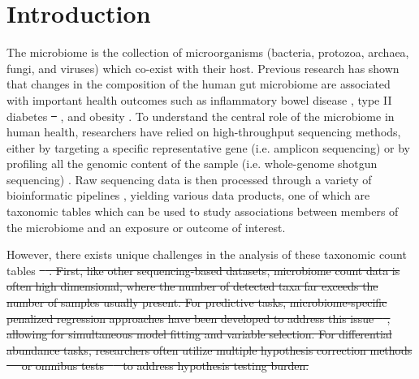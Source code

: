 \documentclass[10pt,letterpaper]{article}
\providecommand{\DIFaddtex}[1]{{\protect\color{blue}\uwave{#1}}} %
\providecommand{\DIFdeltex}[1]{{\protect\color{red}\sout{#1}}}                      %
\providecommand{\DIFaddbegin}{} %
\providecommand{\DIFaddend}{} %
\providecommand{\DIFdelbegin}{} %
\providecommand{\DIFdelend}{} %
\providecommand{\DIFadd}[1]{\texorpdfstring{\DIFaddtex{#1}}{#1}} %
\providecommand{\DIFdel}[1]{\texorpdfstring{\DIFdeltex{#1}}{}} %
\newcommand{\DIFscaledelfig}{0.5}
\newlength{\DIFdelgraphicswidth} %
\newlength{\DIFdelgraphicsheight} %
\newcommand{\DIFaddincludegraphics}[2][]{{\color{blue}\fbox{\DIFOincludegraphics[#1]{#2}}}} %
\newcommand{\DIFdelincludegraphics}[2][]{%
\sbox{\DIFdelgraphicsbox}{\DIFOincludegraphics[#1]{#2}}%
\settoboxwidth{\DIFdelgraphicswidth}{\DIFdelgraphicsbox} %
\settoboxtotalheight{\DIFdelgraphicsheight}{\DIFdelgraphicsbox} %
\scalebox{\DIFscaledelfig}{%
\parbox[b]{\DIFdelgraphicswidth}{\usebox{\DIFdelgraphicsbox}\\[-\baselineskip] \rule{\DIFdelgraphicswidth}{0em}}\llap{\resizebox{\DIFdelgraphicswidth}{\DIFdelgraphicsheight}{%
\setlength{\unitlength}{\DIFdelgraphicswidth}%
\begin{picture}(1,1)%
\thicklines\linethickness{2pt} %
{\color[rgb]{1,0,0}\put(0,0){\framebox(1,1){}}}%
{\color[rgb]{1,0,0}\put(0,0){\line( 1,1){1}}}%
{\color[rgb]{1,0,0}\put(0,1){\line(1,-1){1}}}%
\end{picture}%
}\hspace*{3pt}}} %
} %
\DeclareRobustCommand{\DIFaddbegin}{\DIFOaddbegin \let\includegraphics\DIFaddincludegraphics} %
\DeclareRobustCommand{\DIFaddend}{\DIFOaddend \let\includegraphics\DIFOincludegraphics} %
\DeclareRobustCommand{\DIFdelbegin}{\DIFOdelbegin \let\includegraphics\DIFdelincludegraphics} %
\DeclareRobustCommand{\DIFdelend}{\DIFOaddend \let\includegraphics\DIFOincludegraphics} %
\begin{document}
\section*{Introduction} \DIFaddbegin \label{introduction}
\DIFaddend The microbiome is the collection of microorganisms (bacteria, protozoa, archaea, fungi, and viruses) which co-exist with their host. Previous research has shown that changes in the composition of the human gut microbiome are associated with important health outcomes such as inflammatory bowel disease \cite{proctor2019}, type II diabetes \DIFdelbegin \DIFdel{\mbox{%
\cite{sharma2019}}\hspace{0pt}%
}\DIFdelend \DIFaddbegin \DIFadd{\mbox{%
\cite{sharma2019a}}\hspace{0pt}%
}\DIFaddend , and obesity \cite{aoun2020}. To understand the central role of the microbiome in human health, researchers have relied on high-throughput sequencing methods, either by targeting a specific representative gene (i.e. amplicon sequencing) or by profiling all the genomic content of the sample (i.e. whole-genome shotgun sequencing) \cite{cho2012}. Raw sequencing data is then processed through a variety of bioinformatic pipelines \cite{callahan2016, truong2015}, yielding various data products, one of which are taxonomic tables which can be used to study associations between members of the microbiome and an exposure or outcome of interest. 

However, there exists unique challenges in the analysis of these taxonomic count tables \DIFdelbegin \DIFdel{\mbox{%
\cite{li2019,li2015}}\hspace{0pt}%
. First, like other sequencing-based datasets, microbiome count data is often high dimensional, where the number of detected taxa far exceeds the number of samples usually present. For predictive tasks, microbiome-specific penalized regression approaches have been developed to address this issue \mbox{%
\cite{shi2016}}\hspace{0pt}%
, allowing for simultaneous model fitting and variable selection. For differential abundance tasks, researchers often utilize multiple hypothesis correction methods \mbox{%
\cite{sankaran2014,benjamini1995} }\hspace{0pt}%
or omnibus tests \mbox{%
\cite{chen2018} }\hspace{0pt}%
to address hypothesis testing burden. 
}%
\end{document}
